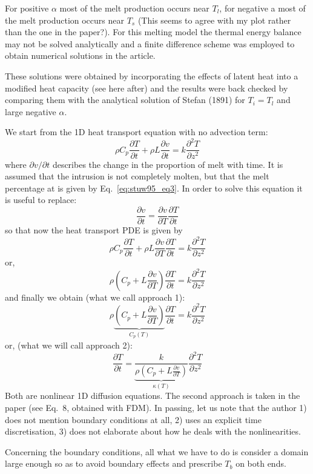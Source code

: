 For positive $\alpha$ most of the melt production occurs near $T_l$, for negative a most of the
melt production occurs near $T_s$ (This seems to agree with my plot rather than the 
one in the paper?). For this melting
model the thermal energy balance may not be
solved analytically and a finite difference scheme
was employed to obtain numerical solutions in the article.

These solutions were obtained by incorporating the effects of latent heat into a modified heat
capacity (see here after) and the results were back checked by
comparing them with the analytical solution of Stefan (1891) for $T_i = T_l$ and large negative $\alpha$.

We start from the 1D heat transport equation with no advection term:
\[
\rho C_p \frac{\partial T}{\partial t} + \rho L \frac{\partial v}{\partial t} 
= k  \frac{\partial^2 T}{\partial z^2} 
\]
where $\partial v/ \partial t$ describes the change in the proportion of melt with time.
It is assumed that the intrusion is not completely molten, but that the
melt percentage at is given by Eq.~\eqref{eq:stuw95_eq3}.
In order to solve this equation it is useful to replace:
\[
\frac{\partial v}{\partial t} = \frac{\partial v}{\partial T}\frac{\partial T}{\partial t}
\]
so that now the heat transport PDE is given by
\[
\rho C_p \frac{\partial T}{\partial t} + \rho L 
\frac{\partial v}{\partial T}\frac{\partial T}{\partial t}
= k  \frac{\partial^2 T}{\partial z^2} 
\]
or,
\[
\rho \left(C_p + L \frac{\partial v}{\partial T} \right)
\frac{\partial T}{\partial t} = k  \frac{\partial^2 T}{\partial z^2} 
\]
and finally we obtain (what we call approach 1):
\[
\boxed{
\rho \underbrace{\left(C_p + L \frac{\partial v}{\partial T} \right)}_{C_p(T)}
\frac{\partial T}{\partial t} = k  \frac{\partial^2 T}{\partial z^2} 
}
\]
or, (what we will call approach 2):
\[
\boxed{
\frac{\partial T}{\partial t} = 
\underbrace{\frac{k}{\rho \left(C_p + L \frac{\partial v}{\partial T} \right)}}_{\kappa(T)} \frac{\partial^2 T}{\partial z^2} 
}
\]
Both are nonlinear 1D diffusion equations.  The second approach 
is taken in the paper (see Eq.~8, obtained with FDM).
In passing, let us note that the author 
1) does not mention boundary conditions at all,
2) uses an explicit time discretisation,
3) does not elaborate about how he deals with the nonlinearities.    

Concerning the boundary conditions, all what we have to do is 
consider a domain large enough so 
as to avoid boundary effects and prescribe $T_b$ on both ends.


